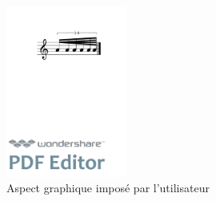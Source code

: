 \documentclass{article}
\newenvironment{gmncode}	{\vspace{-2mm}\small\verbatim}{\endverbatim\vspace{-2mm}}
\begin{document}

\begin{figure}[h]
\centering
\begin{gmncode}
[ 
  \fBeam<durations="1/16,1/64", 
  drawDuration="true">
   (a/8 a/16 a a a/32 a) 
]
\end{gmncode}

\includegraphics[width=4cm]{img/durations.pdf}
\caption{Aspect graphique imposé par l'utilisateur}
\label{fig:utilisateur}
\end{figure}


\end{document}
